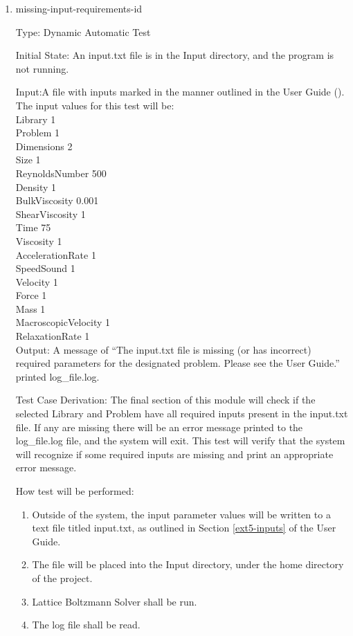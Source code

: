 \documentclass[12pt, titlepage]{article}
\newcommand{\myprogname}{Lattice Boltzmann Solver}
\newcounter{uvtestcounter} %
\begin{document}
\begin{enumerate}
	\item{missing-input-requirements-id\theuvtestcounter\\}
	
Type: Dynamic Automatic Test

Initial State: An input.txt file is in the Input directory, and the program is not running.

Input:A file with inputs marked in the manner outlined in the
User Guide (\citet{LBM_UserGuide_PM}).\\The input values for this test will
be:\\

Library 1\\
Problem 1\\
Dimensions 2\\
Size 1\\
ReynoldsNumber 500\\
Density 1\\
BulkViscosity 0.001\\
ShearViscosity 1\\
Time 75\\
Viscosity 1\\
AccelerationRate 1\\
SpeedSound 1\\
Velocity 1\\
Force 1\\
Mass 1\\
MacroscopicVelocity 1\\
RelaxationRate 1\\

Output: A message of ``The input.txt file is missing (or has incorrect) required parameters for the designated problem. Please see the User Guide.'' printed log\_file.log.

Test Case Derivation: The final section of this module will check if the selected Library and Problem have all required inputs present in the input.txt file. If any are missing there will be an error message printed to the log\_file.log file, and the system will exit. This test will verify that the system will recognize if some required inputs are missing and print an appropriate error message.

How test will be performed: 
\begin{enumerate}
	\item Outside of the system, the input parameter values will be written to a text file titled input.txt, as outlined in Section \ref{ext5-inputs} of the User Guide.
	\item The file will be placed into the Input directory, under the home directory of the project.
	\item {\myprogname} shall be run. 
	\item The log file shall be read.
\end{enumerate}



\end{enumerate}
\end{document}
